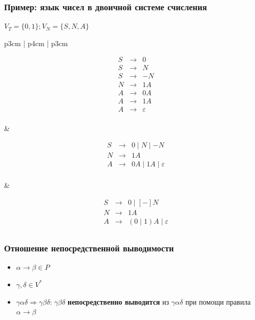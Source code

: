 \documentclass{beamer}
\begin{document}
\begin{frame}[fragile]
  \transwipe[direction=90]
  \frametitle{Пример: язык чисел в двоичной системе счисления}

\begin{center}
  $V_T = \{ 0, 1 \}; V_N = \{ S, N, A \}$
\end{center}

\begin{tabular}{p{3cm} | p{4cm} | p{3cm}}

\[
\begin{array}{crcl}
&S& \rightarrow & 0 \\
&S& \rightarrow & N \\
&S& \rightarrow & - N \\
&N& \rightarrow & 1 A \\
&A& \rightarrow & 0 A \\
&A& \rightarrow & 1 A \\
&A& \rightarrow & \varepsilon \\
\end{array}
\]

& \pause

\[
\begin{array}{crcl}
&S& \rightarrow & 0 \mid N \mid - N  \\
&N& \rightarrow & 1 A \\
&A& \rightarrow & 0 A \mid 1 A  \mid \varepsilon\\
\end{array}
\]

& \pause

\[
\begin{array}{crcl}
&S& \rightarrow & 0 \mid [-] N  \\
&N& \rightarrow & 1 A \\
&A& \rightarrow & (0 \mid 1) A  \mid \varepsilon\\
\end{array}
\]

\end{tabular}
\end{frame}

\begin{frame}[fragile]
  \transwipe[direction=90]
  \frametitle{Отношение непосредственной выводимости}
  \begin{itemize}
    \item $\alpha \rightarrow \beta \in P$
    \item $\gamma, \delta \in V^*$
    \item $\gamma \alpha \delta \Rightarrow \gamma \beta \delta$: $\gamma \beta \delta$ \textbf{непосредственно выводится} из $\gamma \alpha \delta$ при помощи правила $\alpha \rightarrow \beta$
  \end{itemize}
\end{frame}
\end{document}
